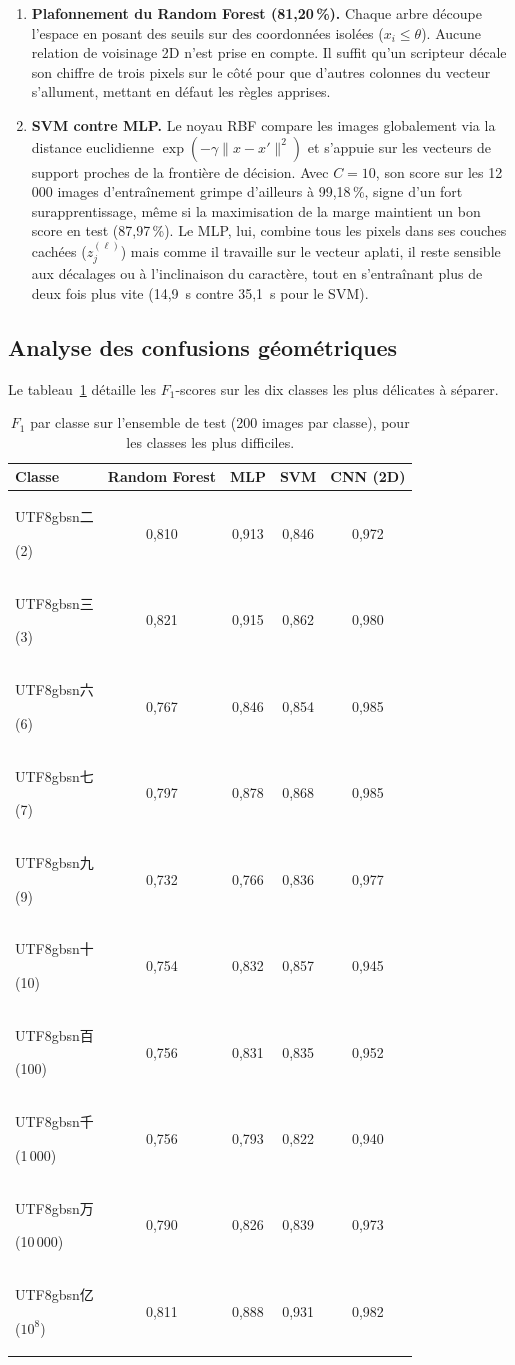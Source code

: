 \documentclass[10pt,a4paper]{article}
\newcommand{\zh}[1]{\begin{CJK}{UTF8}{gbsn}#1\end{CJK}}
\begin{document}
\begin{enumerate}
\item \textbf{Plafonnement du Random Forest (81,20\,\%).} Chaque arbre découpe l'espace en posant des seuils sur des coordonnées isolées ($x_i \le \theta$). Aucune relation de voisinage 2D n'est prise en compte. Il suffit qu'un scripteur décale son chiffre de trois pixels sur le côté pour que d'autres colonnes du vecteur s'allument, mettant en défaut les règles apprises.

\item \textbf{SVM contre MLP.} Le noyau RBF compare les images globalement via la distance euclidienne $\exp(-\gamma\|x-x'\|^2)$ et s'appuie sur les vecteurs de support proches de la frontière de décision. Avec $C=10$, son score sur les 12\,000 images d'entraînement grimpe d'ailleurs à 99,18\,\%, signe d'un fort surapprentissage, même si la maximisation de la marge maintient un bon score en test (87,97\,\%). Le MLP, lui, combine tous les pixels dans ses couches cachées ($z^{(\ell)}_j$) mais comme il travaille sur le vecteur aplati, il reste sensible aux décalages ou à l'inclinaison du caractère, tout en s'entraînant plus de deux fois plus vite (14,9~s contre 35,1~s pour le SVM).
\end{enumerate}

\subsection{Analyse des confusions géométriques}
Le tableau~\ref{tab:conf} détaille les $F_1$-scores sur les dix classes les plus délicates à séparer.

\begin{table}[H]
\centering
\caption{$F_1$ par classe sur l'ensemble de test (200 images par classe), pour les classes les plus difficiles.}
\label{tab:conf}
\begin{tabular}{lcccc}
\toprule
\textbf{Classe} & \textbf{Random Forest} & \textbf{MLP} & \textbf{SVM} & \textbf{CNN (2D)} \\
\midrule
\zh{二} (2) & 0,810 & 0,913 & 0,846 & 0,972 \\
\zh{三} (3) & 0,821 & 0,915 & 0,862 & 0,980 \\
\zh{六} (6) & 0,767 & 0,846 & 0,854 & 0,985 \\
\zh{七} (7) & 0,797 & 0,878 & 0,868 & 0,985 \\
\zh{九} (9) & 0,732 & 0,766 & 0,836 & 0,977 \\
\zh{十} (10) & 0,754 & 0,832 & 0,857 & 0,945 \\
\zh{百} (100) & 0,756 & 0,831 & 0,835 & 0,952 \\
\zh{千} (1\,000) & 0,756 & 0,793 & 0,822 & 0,940 \\
\zh{万} (10\,000) & 0,790 & 0,826 & 0,839 & 0,973 \\
\zh{亿} ($10^8$) & 0,811 & 0,888 & 0,931 & 0,982 \\
\bottomrule
\end{tabular}
\end{table}
\end{document}
